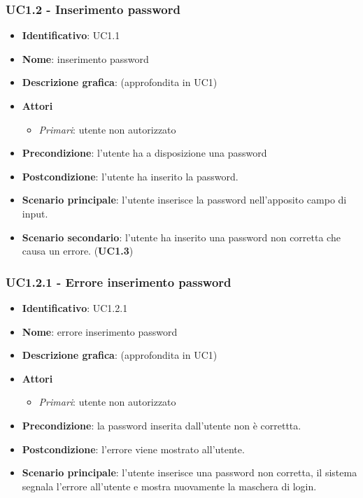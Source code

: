 \subsubsection{UC1.2 - Inserimento password}
\begin{itemize}
  \item \textbf{Identificativo}: UC1.1
  \item \textbf{Nome}: inserimento password
  \item \textbf{Descrizione grafica}: (approfondita in UC1)
  \item \textbf{Attori}
        \begin{itemize}
          \item \textit{Primari}: utente non autorizzato
        \end{itemize}
  \item \textbf{Precondizione}: l'utente ha a disposizione una password
  \item \textbf{Postcondizione}: l'utente ha inserito la password.
  \item \textbf{Scenario principale}: l'utente inserisce la password nell'apposito campo di input.
  \item \textbf{Scenario secondario}: l'utente ha inserito una password non corretta che causa un errore. (\textbf{UC1.3})
\end{itemize}

\subsubsection{UC1.2.1 - Errore inserimento password}
\begin{itemize}
  \item \textbf{Identificativo}: UC1.2.1
  \item \textbf{Nome}: errore inserimento password
  \item \textbf{Descrizione grafica}: (approfondita in UC1)
  \item \textbf{Attori}
        \begin{itemize}
          \item \textit{Primari}: utente non autorizzato
        \end{itemize}
  \item \textbf{Precondizione}: la password inserita dall'utente non è correttta.
  \item \textbf{Postcondizione}: l'errore viene mostrato all'utente.
  \item \textbf{Scenario principale}: l'utente inserisce una password non corretta, il sistema segnala l'errore all'utente e mostra nuovamente la maschera di login.
\end{itemize}

